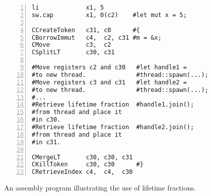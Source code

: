 \begin{figure}[h]
\begin{lstlisting}[style=custASM, numbers = left ,xleftmargin=1.5em]
li             x1, 5
sw.cap         x1, 0(c2)    #let mut x = 5;

CCreateToken   c31, c0      #{
CBorrowImmut   c4,  c2, c31 #m = &x;
CMove          c3,  c2
CSplitLT       c30, c31

#Move registers c2 and c30   #let handle1 =
#to new thread.              #thread::spawn(...);
#Move registers c3 and c31   #let handle2 =
#to new thread.              #thread::spawn(...);
#...
#Retrieve lifetime fraction  #handle1.join();
#from thread and place it
#in c30.
#Retrieve lifetime fraction  #handle2.join();
#from thread and place it
#in c31.

CMergeLT       c30, c30, c31
CKillToken     c30, c30      #}
CRetrieveIndex c4,  c4,  c30
\end{lstlisting}
\caption{An assembly program illustrating the use of lifetime fractions.}
\label{fig:asmthreadexample}
\end{figure}
